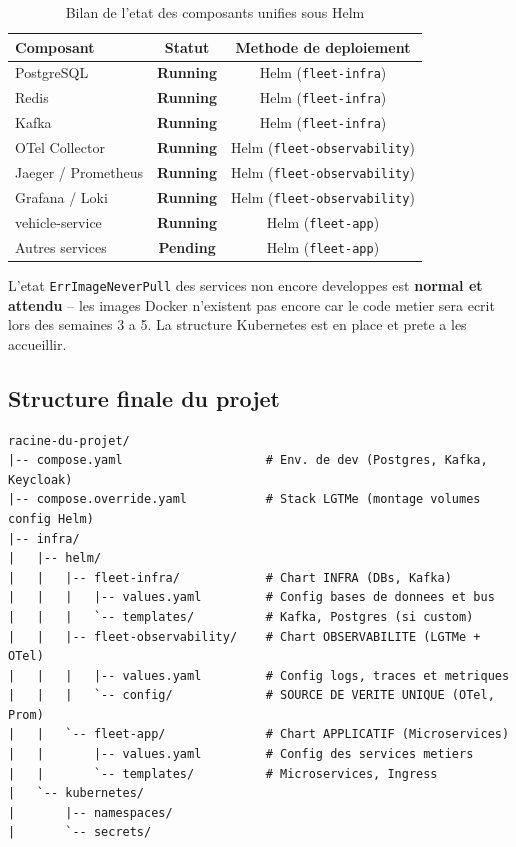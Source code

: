 \documentclass[12pt,a4paper]{article}
\begin{document}
\begin{table}[H]
  \centering
  \begin{tabular}{lcc}
    \toprule
    \textbf{Composant} & \textbf{Statut} & \textbf{Methode de deploiement} \\
    \midrule
    PostgreSQL           & \textcolor{success}{\textbf{Running}} & Helm (\texttt{fleet-infra}) \\
    Redis                & \textcolor{success}{\textbf{Running}} & Helm (\texttt{fleet-infra}) \\
    Kafka                & \textcolor{success}{\textbf{Running}} & Helm (\texttt{fleet-infra}) \\
    OTel Collector       & \textcolor{success}{\textbf{Running}} & Helm (\texttt{fleet-observability}) \\
    Jaeger / Prometheus  & \textcolor{success}{\textbf{Running}} & Helm (\texttt{fleet-observability}) \\
    Grafana / Loki       & \textcolor{success}{\textbf{Running}} & Helm (\texttt{fleet-observability}) \\
    vehicle-service      & \textcolor{success}{\textbf{Running}} & Helm (\texttt{fleet-app}) \\
    Autres services      & \textcolor{warning}{\textbf{Pending}} & Helm (\texttt{fleet-app}) \\
    \bottomrule
  \end{tabular}
  \caption{Bilan de l'etat des composants unifies sous Helm}
\end{table}

\begin{infobox}
L'etat \texttt{ErrImageNeverPull} des services non encore developpes est
\textbf{normal et attendu} -- les images Docker n'existent pas encore car le code
metier sera ecrit lors des semaines 3 a 5. La structure Kubernetes est en place et
prete a les accueillir.
\end{infobox}

\subsection{Structure finale du projet}

\begin{lstlisting}[caption=Arborescence des dossiers d'infrastructure]
racine-du-projet/
|-- compose.yaml                    # Env. de dev (Postgres, Kafka, Keycloak)
|-- compose.override.yaml           # Stack LGTMe (montage volumes config Helm)
|-- infra/
|   |-- helm/
|   |   |-- fleet-infra/            # Chart INFRA (DBs, Kafka)
|   |   |   |-- values.yaml         # Config bases de donnees et bus
|   |   |   `-- templates/          # Kafka, Postgres (si custom)
|   |   |-- fleet-observability/    # Chart OBSERVABILITE (LGTMe + OTel)
|   |   |   |-- values.yaml         # Config logs, traces et metriques
|   |   |   `-- config/             # SOURCE DE VERITE UNIQUE (OTel, Prom)
|   |   `-- fleet-app/              # Chart APPLICATIF (Microservices)
|   |       |-- values.yaml         # Config des services metiers
|   |       `-- templates/          # Microservices, Ingress
|   `-- kubernetes/
|       |-- namespaces/
|       `-- secrets/
\end{lstlisting}
\end{document}
